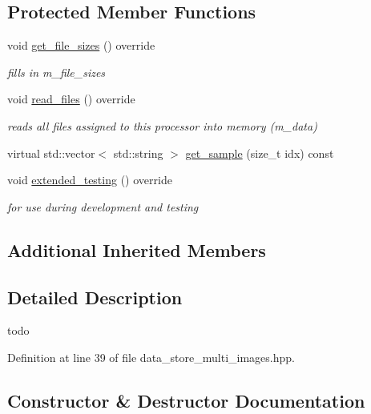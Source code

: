 \subsection*{Protected Member Functions}
\begin{DoxyCompactItemize}
\item 
void \hyperlink{classlbann_1_1data__store__multi__images_a25963dfa7d6de983e7b250f8ef7e2a0e}{get\+\_\+file\+\_\+sizes} () override
\begin{DoxyCompactList}\small\item\em fills in m\+\_\+file\+\_\+sizes \end{DoxyCompactList}\item 
void \hyperlink{classlbann_1_1data__store__multi__images_a8ce8ccf3c7b0d19adfb838108bec075b}{read\+\_\+files} () override
\begin{DoxyCompactList}\small\item\em reads all files assigned to this processor into memory (m\+\_\+data) \end{DoxyCompactList}\item 
virtual std\+::vector$<$ std\+::string $>$ \hyperlink{classlbann_1_1data__store__multi__images_a39108690484fe407efafefe6a4b0947b}{get\+\_\+sample} (size\+\_\+t idx) const
\item 
void \hyperlink{classlbann_1_1data__store__multi__images_abe17bbf485f6da9d7dfa568e9e74a693}{extended\+\_\+testing} () override
\begin{DoxyCompactList}\small\item\em for use during development and testing \end{DoxyCompactList}\end{DoxyCompactItemize}
\subsection*{Additional Inherited Members}


\subsection{Detailed Description}
todo 

Definition at line 39 of file data\+\_\+store\+\_\+multi\+\_\+images.\+hpp.



\subsection{Constructor \& Destructor Documentation}
\mbox{\label{classlbann_1_1data__store__multi__images_a1ad4fbec5c15f98422ebf7027f3a1d8a}} 
